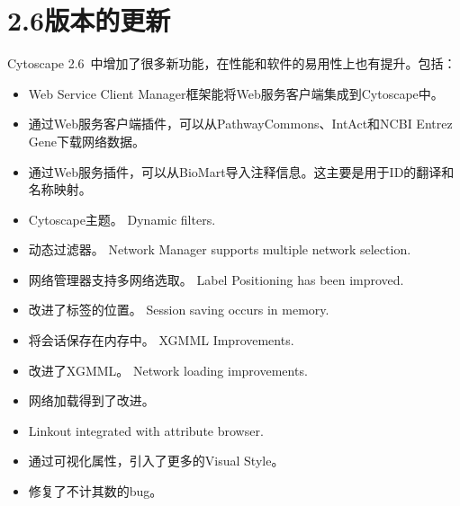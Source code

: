 \section{2.6版本的更新}
Cytoscape 2.6~中增加了很多新功能，在性能和软件的易用性上也有提升。包括：
\begin{itemize}
\item Web Service Client Manager框架能将Web服务客户端集成到Cytoscape中。
\item 通过Web服务客户端插件，可以从PathwayCommons、IntAct和NCBI Entrez Gene下载网络数据。
\item 通过Web服务插件，可以从BioMart导入注释信息。这主要是用于ID的翻译和名称映射。
\item Cytoscape主题。
Dynamic filters.
\item 动态过滤器。
Network Manager supports multiple network selection.
\item 网络管理器支持多网络选取。
Label Positioning has been improved.
\item 改进了标签的位置。
Session saving occurs in memory.
\item 将会话保存在内存中。
XGMML Improvements.
\item 改进了XGMML。
Network loading improvements.
\item 网络加载得到了改进。
\item Linkout integrated with attribute browser.
\item 通过可视化属性，引入了更多的Visual Style。
\item 修复了不计其数的bug。
\end{itemize}
